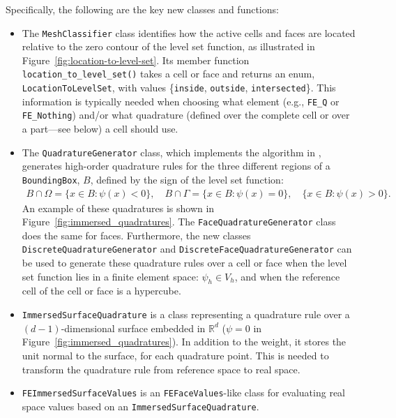 \documentclass{ansarticle-preprint}
\begin{document}
Specifically, the following are the key new classes and functions:
\begin{itemize}
  \item The \texttt{MeshClassifier} class identifies how the active cells and faces are located relative to the zero contour of the level set function, as illustrated in Figure~\ref{fig:location-to-level-set}. Its member function \texttt{location\_to\_level\_set()} takes a cell or face and
        returns an enum, \texttt{LocationToLevelSet}, with values \{\texttt{inside}, \texttt{outside}, \texttt{intersected}\}.
        This information is typically needed when choosing what element (e.g., \texttt{FE\_Q} or \texttt{FE\_Nothing}) and/or what quadrature (defined over the 
        complete cell or over a part---see below) a cell
        should use.

  \item The \texttt{QuadratureGenerator} class, which implements the algorithm in \cite{saye2015}, generates high-order quadrature rules for the three different regions of a \texttt{BoundingBox}, $B$, defined by the sign of the level set function:
        \begin{align}\label{eq:boundingbox}
          B \cap \Omega = \{ x\in B:  \psi(x) < 0 \},  \quad
          B \cap \Gamma = \{ x\in B:  \psi(x) = 0 \},  \quad
          \{ x\in B:  \psi(x) > 0 \}.
        \end{align}
        An example of these quadratures is shown in Figure~\ref{fig:immersed_quadratures}.
        The \texttt{FaceQuadratureGenerator} class does the same for faces.
        Furthermore, the new classes \texttt{DiscreteQuadratureGenerator} and \texttt{DiscreteFaceQuadratureGenerator} can be used to generate these quadrature rules over a cell or face when the level set function lies in a finite element space: $\psi_h \in V_h$, and when the reference cell of the cell or face is a hypercube.

  \item \texttt{ImmersedSurfaceQuadrature} is a class representing a quadrature rule over a $(d-1)$-dimensional surface embedded in $\mathbb{R}^d$ ($\psi = 0$ in Figure~\ref{fig:immersed_quadratures}). In addition to the weight, it stores the unit normal to the surface, for each quadrature point. This is needed to transform the quadrature rule from reference space to real space.

  \item \texttt{FEImmersedSurfaceValues} is an \texttt{FEFaceValues}-like class for evaluating real space values based on an \texttt{ImmersedSurfaceQuadrature}.


\end{itemize}
\end{document}

